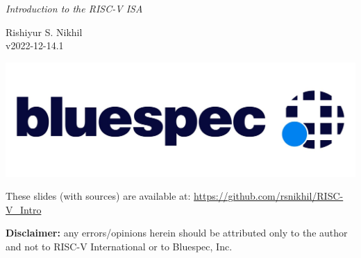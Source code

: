 \documentclass{article}
\newcommand{\docversion}{v2022-12-14.1}
\begin{document}

\vspace*{0.5in}

\begin{center}\Huge
  \emph{Introduction to the RISC-V ISA}

  \vspace*{0.5in}

  Rishiyur S. Nikhil \\
  {\docversion}

  \vspace*{1in}

  \includegraphics[scale=0.7]{Figs/Bluespec_Logo_2022-10.jpg}

  \vfill

  \begin{minipage}{8in}\Large
    These slides (with sources) are available at: \url{https://github.com/rsnikhil/RISC-V_Intro}

    \vspace{1ex}

    {\bf Disclaimer:} any errors/opinions herein should be attributed
    only to the author and not to RISC-V International or to
    Bluespec, Inc.
  \end{minipage}

\end{center}

\clearpage

\end{document}
